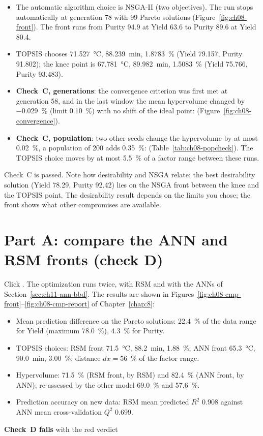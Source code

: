 \begin{itemize}
  \item The automatic algorithm choice is NSGA-II (two objectives). The run stops automatically at generation 78 with
        99 Pareto solutions (Figure~\ref{fig:ch08-front}). The front runs from Purity 94.9 at Yield 63.6 to Purity 89.6
        at Yield 80.4.
  \item TOPSIS chooses 71.527~°C, 88.239~min, 1.8783~\% (Yield 79.157, Purity 91.802); the knee point is 67.781~°C,
        89.982~min, 1.5083~\% (Yield 75.766, Purity 93.483).
  \item \textbf{Check~C, generations}: the convergence criterion was first met at generation 58, and in the last window
        the mean hypervolume changed by $-0.029$~\% (limit 0.10~\%) with no shift of the ideal point:
         (Figure~\ref{fig:ch08-convergence}).
  \item \textbf{Check~C, population}: two other seeds change the hypervolume by at most 0.02~\%, a population of 200
        adds 0.35~\%:  (Table~\ref{tab:ch08-popcheck}). The TOPSIS choice moves by at most
        5.5~\% of a factor range between these runs.
\end{itemize}
Check~C is passed. Note how desirability and NSGA relate: the best desirability solution (Yield 78.29, Purity 92.42)
lies on the NSGA front between the knee and the TOPSIS point. The desirability result depends on the limits you chose;
the front shows what other compromises are available.

\section{Part A: compare the ANN and RSM fronts (check D)}
\label{sec:ch11-checkD}
Click . The optimization runs twice, with RSM and with the ANNs of
Section~\ref{sec:ch11-ann-bbd}. The results are shown in Figures~\ref{fig:ch08-cmp-front}--\ref{fig:ch08-cmp-report}
of Chapter~\ref{chap:8}:
\begin{itemize}
  \item Mean prediction difference on the Pareto solutions: 22.4~\% of the data range for Yield (maximum 78.0~\%),
        4.3~\% for Purity.
  \item TOPSIS choices: RSM front 71.5~°C, 88.2~min, 1.88~\%; ANN front 65.3~°C, 90.0~min, 3.00~\%; distance
        $dx=56$~\% of the factor range.
  \item Hypervolume: 71.5~\% (RSM front, by RSM) and 82.4~\% (ANN front, by ANN); re-assessed by the other model 69.0~\%
        and 57.6~\%.
  \item Prediction accuracy on new data: RSM mean predicted $R^2$ 0.908 against ANN mean cross-validation $Q^2$
        0.699.
\end{itemize}
\textbf{Check~D fails} with the red verdict 

